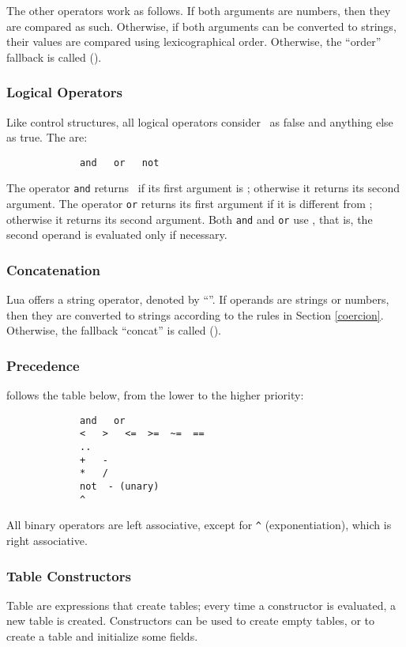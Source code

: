 The other operators work as follows.
If both arguments are numbers, then they are compared as such.
Otherwise, if both arguments can be converted to strings,
their values are compared using lexicographical order.
Otherwise, the ``order'' fallback is called ().

\subsubsection{Logical Operators}
Like control structures, all logical operators
consider \nil\ as false and anything else as true.
The  are:
\begin{verbatim}
             and   or   not
\end{verbatim}
The operator \verb'and' returns \nil\ if its first argument is \nil;
otherwise it returns its second argument.
The operator \verb'or' returns its first argument
if it is different from \nil;
otherwise it returns its second argument.
Both \verb'and' and \verb'or' use ,
that is,
the second operand is evaluated only if necessary.

\subsubsection{Concatenation}
Lua offers a string  operator,
denoted by ``''.
If operands are strings or numbers, then they are converted to
strings according to the rules in Section \ref{coercion}.
Otherwise, the fallback ``concat'' is called ().

\subsubsection{Precedence}
 follows the table below,
from the lower to the higher priority:
\begin{verbatim}
             and   or
             <   >   <=  >=  ~=  ==
             ..
             +   -
             *   /
             not  - (unary)
             ^
\end{verbatim}
All binary operators are left associative,
except for \verb'^' (exponentiation),
which is right associative.

\subsubsection{Table Constructors} \label{tableconstructor}
Table  are expressions that create tables;
every time a constructor is evaluated, a new table is created.
Constructors can be used to create empty tables,
or to create a table and initialize some fields.

